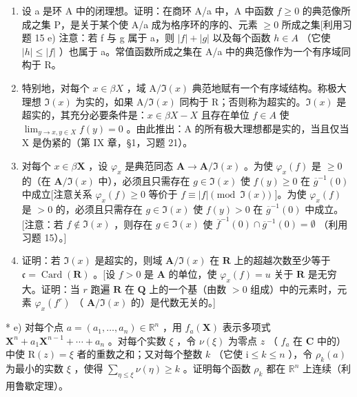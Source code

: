\begin{enumerate}
\def\labelenumi{\alph{enumi})}
\item
  设 a 是环 A 中的闭理想。证明：在商环 A/a 中，A 中函数 \(f \geqslant 0\) 的典范像所成之集 P，是关于某个使 A/a 成为格序环的序的、元素 \(\geqslant 0\) 所成之集{[}利用习题 15 e) 注意：若 f 与 g 属于 a，则 \(|f| + |g|\) 以及每个函数 \(h \in A\) （它使 \(|h| \leqslant |f|\) ）也属于 a。常值函数所成之集在 A/a 中的典范像作为一个有序域同构于 R。
\item
  特别地，对每个 \(x \in \beta X\) ，域 \(\mathrm{A}/\Im(x)\) 典范地赋有一个有序域结构。称极大理想 \(\Im(x)\) 为实的，如果 \(\mathrm{A}/\Im(x)\) 同构于 R；否则称为超实的。\(\Im(x)\) 是超实的，其充分必要条件是：\(x \in \beta X - X\) 且存在单位 \(f \in A\) 使 \(\lim_{y \to x, y \in X} f(y) = 0\) 。由此推出：A 的所有极大理想都是实的，当且仅当 X 是伪紧的（第 IX 章，§1，习题 21）。
\item
  对每个 \(x \in \beta\mathbf{X}\) ，设 \(\varphi_x\) 是典范同态 \(\mathbf{A} \to \mathbf{A}/\Im(x)\) 。为使 \(\varphi_x(f)\) 是 \(\geqslant 0\) 的（在 \(\mathbf{A}/\Im(x)\) 中），必须且只需存在 \(g \in \Im(x)\) 使 \(f(y) \geqslant 0\) 在 \(\overline{g}^{-1}(0)\) 中成立{[}注意关系 \(\varphi_x(f) \geqslant 0\) 等价于 \(f \equiv |f|\pmod{\Im(x)}\) {]}。为使 \(\varphi_x(f)\) 是 \(>0\) 的，必须且只需存在 \(g \in \Im(x)\) 使 \(f(y) > 0\) 在 \(\overline{g}^{-1}(0)\) 中成立。{[}注意：若 \(f \notin \Im(x)\) ，则存在 \(g \in \Im(x)\) 使 \(\overline{f}^{-1}(0) \cap \overline{g}^{-1}(0) = \emptyset\) （利用习题 15）。{]}
\item
  证明：若 \(\Im(x)\) 是超实的，则域 \(\mathbf{A}/\Im(x)\) 在 \(\mathbf{R}\) 上的超越次数至少等于 \(\mathfrak{c}=\operatorname{Card}(\mathbf{R})\) 。{[}设 \(f>0\) 是 \(\mathbf{A}\) 的单位，使 \(\varphi_x(f)=u\) 关于 \(\mathbf{R}\) 是无穷大。证明：当 \(r\) 跑遍 \(\mathbf{R}\) 在 \(\mathbf{Q}\) 上的一个基（由数 \(>0\) 组成）中的元素时，元素 \(\varphi_x(f^r)\) （ \(\mathbf{A}/\Im(x)\) 的）是代数无关的。{]}
\end{enumerate}

* e) 对每个点 \(a = (a_{1}, \ldots, a_{n}) \in \mathbb{R}^{n}\) ，用 \(f_{a}(\mathbf{X})\) 表示多项式 \(\mathbf{X}^{n} + a_{1}\mathbf{X}^{n-1} + \cdots + a_{n}\) 。对每个实数 \(\xi\) ，令 \(\nu(\xi)\) 为零点 \(z\) （ \(f_{a}\) 在 \(\mathbf{C}\) 中的）中使 \(\mathrm{R}(z) = \xi\) 者的重数之和；又对每个整数 \(k\) （它使 \(\mathrm{i} \leqslant k \leqslant n\) ），令 \(\rho_{k}(a)\) 为最小的实数 \(\xi\) ，使得 \(\sum_{\eta \leqslant \xi} \nu(\eta) \geqslant k\) 。证明每个函数 \(\rho_{k}\) 都在 \(\mathbb{R}^{n}\) 上连续（利用鲁歇定理）。


